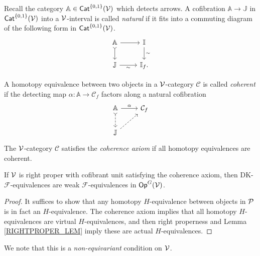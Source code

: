 \documentclass[a4paper,10pt
,draft
]{article}%
\renewcommand{\F}{\mathcal F}
\newcommand{\I}{\mathbb I}
\newcommand{\J}{\mathbb J}
\renewcommand{\1}{\eta}%
\begin{document}
\begin{definition}
      Recall the category $\mathbb A \in \Cat^{\set{0,1}}(\V)$ which detects arrows.
      A cofibration $\mathbb A \to \J$ in $\Cat^{\set{0,1}}(\V)$ into a $\V$-interval is called \textit{natural} if
      it fits into a commuting diagram of the following form in $\Cat^{\set{0,1}}(\V)$.
      \begin{equation}
            \begin{tikzcd}
                  \mathbb A \arrow[d, tail] \arrow[r]
                  &
                  \I \arrow[d, "\sim"]
                  \\
                  \J \arrow[r, "\sim"']
                  &
                  \I_f.
            \end{tikzcd}
      \end{equation}

      A homotopy equivalence between two objects in a $\V$-category $\mathcal C$ is called \textit{coherent} if
      the detecting map $\alpha: \mathbb A \to \mathcal C_f$ factors along a natural cofibration
      \begin{equation}
            \begin{tikzcd}
                  \mathbb A \arrow[r, "\alpha"] \arrow[d, tail, dashed]
                  &
                  \mathcal C_f
                  \\
                  \J \arrow[ur, dashed]
            \end{tikzcd}
      \end{equation}
      The $\V$-category $\mathcal C$ satisfies the \textit{coherence axiom} if all homotopy equivalences are coherent.
\end{definition}

\begin{proposition}
      \label{COH_DK_ARE_WE_PROP}
      If $\V$ is right proper with cofibrant unit satisfying the coherence axiom, then
      DK-$\F$-equivalences are weak $\F$-equivalences in $\Op^G(\V)$.
\end{proposition}
\begin{proof}
      It suffices to show that any homotopy $H$-equivalence between objects in $\P$ is in fact an $H$-equivalence.
      The coherence axiom implies that all homotopy $H$-equivalences are virtual $H$-equivalences, and then
      right properness and Lemma \ref{RIGHTPROPER_LEM} imply these are actual $H$-equivalences.
\end{proof}

\begin{remark}
      We note that this is a \textit{non-equivariant} condition on $\V$.
\end{remark}
\end{document}

